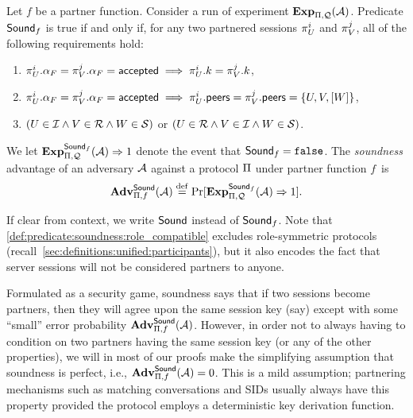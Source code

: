 \begin{definition}\label{def:predicate:soundness}
Let $f$ be a partner function.
Consider a run of experiment $\mathbf{Exp}_{\mathrm{\Pi},\mathcal{Q}}^{}(\mathcal{A})$.
Predicate $\mathsf{Sound}_f$ is true if and only if,
for any two partnered sessions $\oracle[U][i]$ and $\oracle[V][j]$,
all of the following requirements hold:
\begin{enumerate}
	\item $\oracle[U][i].\runstate_F = \oracle[V][j].\runstate_F = \accepted \implies \oracle[U][i].\key = \oracle[V][j].\key$,
	
	\item $\oracle[U][i].\runstate_F = \oracle[V][j].\runstate_F = \accepted \implies \oracle[U][i].\peers = \oracle[V][j].\peers = \lbrace U, V, [W] \rbrace$,
	
	\item\label{def:predicate:soundness:role_compatible} $\left( U \in \mathcal{I} \land V \in \mathcal{R} \land W \in \mathcal{S} \right)$ or $\left(U \in \mathcal{R} \land V \in \mathcal{I} \land W \in \mathcal{S} \right)$.
	
	
\end{enumerate}

We let $\mathbf{Exp}_{\mathrm{\Pi},\mathcal{Q}}^{\mathsf{Sound}_f}(\mathcal{A}) \Rightarrow 1$ denote the event that $\mathsf{Sound}_f = \mathtt{false}$.
The \emph{soundness} advantage of an adversary $\mathcal{A}$ against a protocol $\mathrm{\Pi}$ under partner function $f$~is 
\begin{equation}
	\mathbf{Adv}_{\mathrm{\Pi},f}^{\mathsf{Sound}}(\mathcal{A}) \overset{\mathrm{def}}{=}  \Pr[\mathbf{Exp}_{\mathrm{\Pi},\mathcal{Q}}^{\mathsf{Sound}_f}(\mathcal{A}) \Rightarrow 1] .
\end{equation} 

\end{definition}
\smallskip

If clear from context,
we write $\mathsf{Sound}$ instead of $\mathsf{Sound}_f$. 
Note that \cref{def:predicate:soundness:role_compatible} excludes role-symmetric protocols (recall~\cref{sec:definitions:unified:participants}),
but it also encodes the fact that server sessions will not be considered partners to anyone. 

Formulated as a security game,
soundness says that if two sessions become partners,
then they will agree upon the same session key (say) except with some ``small'' error probability $\mathbf{Adv}_{\mathrm{\Pi},f}^{\mathsf{Sound}}(\mathcal{A})$.
However,
in order not to always having to condition on two partners having the same session key
(or any of the other properties),
we will in most of our proofs make the simplifying assumption that soundness is perfect,
i.e., $\mathbf{Adv}_{\mathrm{\Pi},f}^{\mathsf{Sound}}(\mathcal{A}) = 0$.
This is a mild assumption;
partnering mechanisms such as matching conversations and SIDs usually always have this property provided the protocol employs a deterministic key derivation function.


